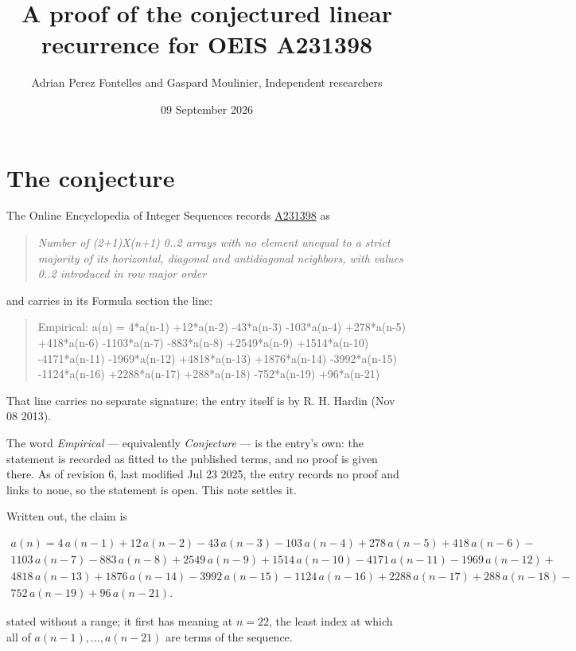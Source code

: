 \documentclass[11pt]{article}
\title{A proof of the conjectured linear recurrence for OEIS A231398}
\author{Adrian Perez Fontelles and Gaspard Moulinier, Independent researchers}
\date{09 September 2026}
\theoremstyle{definition}
\begin{document}
\maketitle
\section{The conjecture}

The Online Encyclopedia of Integer Sequences records \href{https://oeis.org/A231398}{A231398} as

\begin{quote}\itshape Number of (2+1)X(n+1) 0..2 arrays with no element unequal to a strict majority of its horizontal, diagonal and antidiagonal neighbors, with values 0..2 introduced in row major order\end{quote}

and carries in its Formula section the line:

\begin{quote}\ttfamily Empirical: a(n) = 4*a(n-1) +12*a(n-2) -43*a(n-3) -103*a(n-4) +278*a(n-5) +418*a(n-6) -1103*a(n-7) -883*a(n-8) +2549*a(n-9) +1514*a(n-10) -4171*a(n-11) -1969*a(n-12) +4818*a(n-13) +1876*a(n-14) -3992*a(n-15) -1124*a(n-16) +2288*a(n-17) +288*a(n-18) -752*a(n-19) +96*a(n-21)\end{quote}

That line carries no separate signature; the entry itself is by R. H. Hardin (Nov 08 2013).

The word {\itshape Empirical} --- equivalently {\itshape Conjecture} --- is the entry's own: the statement is recorded as fitted to the published terms, and no proof is given there. As of revision 6, last modified Jul 23 2025, the entry records no proof and links to none, so the statement is open. This note settles it.

Written out, the claim is

\begin{multline*} a(n) = 4\,a(n-1) + 12\,a(n-2) - 43\,a(n-3) - 103\,a(n-4) + 278\,a(n-5) + 418\,a(n-6) - \\ 1103\,a(n-7) - 883\,a(n-8) + 2549\,a(n-9) + 1514\,a(n-10) - 4171\,a(n-11) - 1969\,a(n-12) + \\ 4818\,a(n-13) + 1876\,a(n-14) - 3992\,a(n-15) - 1124\,a(n-16) + 2288\,a(n-17) + 288\,a(n-18) - \\ 752\,a(n-19) + 96\,a(n-21). \end{multline*}

stated without a range; it first has meaning at $n = 22$, the least index at which all of $a(n-1),\dots,a(n-21)$ are terms of the sequence.
\end{document}
